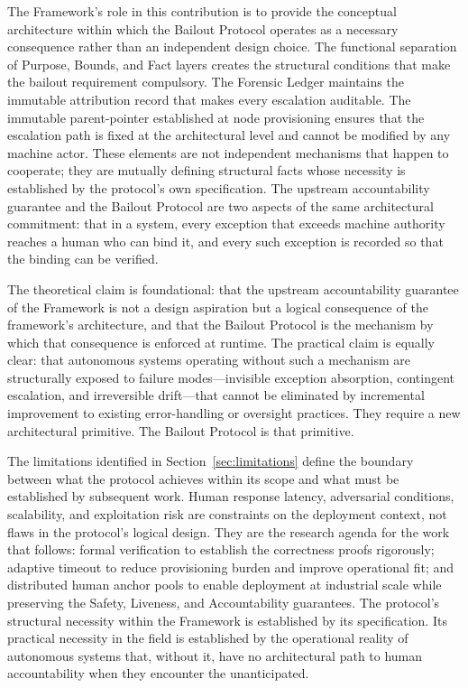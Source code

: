 The \bxthree{} Framework's role in this contribution is to provide the conceptual architecture within which the Bailout Protocol operates as a necessary consequence rather than an independent design choice. The functional separation of Purpose, Bounds, and Fact layers creates the structural conditions that make the bailout requirement compulsory. The Forensic Ledger maintains the immutable attribution record that makes every escalation auditable. The immutable parent-pointer established at node provisioning ensures that the escalation path is fixed at the architectural level and cannot be modified by any machine actor. These elements are not independent mechanisms that happen to cooperate; they are mutually defining structural facts whose necessity is established by the protocol's own specification. The upstream accountability guarantee and the Bailout Protocol are two aspects of the same architectural commitment: that in a \bxthree{} system, every exception that exceeds machine authority reaches a human who can bind it, and every such exception is recorded so that the binding can be verified.

The theoretical claim is foundational: that the upstream accountability guarantee of the \bxthree{} Framework is not a design aspiration but a logical consequence of the framework's architecture, and that the Bailout Protocol is the mechanism by which that consequence is enforced at runtime. The practical claim is equally clear: that autonomous systems operating without such a mechanism are structurally exposed to failure modes---invisible exception absorption, contingent escalation, and irreversible drift---that cannot be eliminated by incremental improvement to existing error-handling or oversight practices. They require a new architectural primitive. The Bailout Protocol is that primitive.

The limitations identified in Section~\ref{sec:limitations} define the boundary between what the protocol achieves within its scope and what must be established by subsequent work. Human response latency, adversarial conditions, scalability, and exploitation risk are constraints on the deployment context, not flaws in the protocol's logical design. They are the research agenda for the work that follows: formal verification to establish the correctness proofs rigorously; adaptive timeout to reduce provisioning burden and improve operational fit; and distributed human anchor pools to enable deployment at industrial scale while preserving the Safety, Liveness, and Accountability guarantees. The protocol's structural necessity within the \bxthree{} Framework is established by its specification. Its practical necessity in the field is established by the operational reality of autonomous systems that, without it, have no architectural path to human accountability when they encounter the unanticipated.
